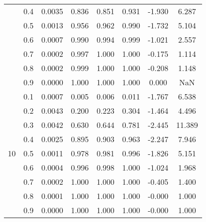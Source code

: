 \documentclass[11pt,a4paper]{report}
\begin{document}
\begin{longtable}{ | c | c || c | c | c | c | c | c | }
 & 0.4 & 0.0035 & 0.836 & 0.851 & 0.931 & -1.930 & 6.287 \\
 & 0.5 & 0.0013 & 0.956 & 0.962 & 0.990 & -1.732 & 5.104 \\
 & 0.6 & 0.0007 & 0.990 & 0.994 & 0.999 & -1.021 & 2.557 \\
 & 0.7 & 0.0002 & 0.997 & 1.000 & 1.000 & -0.175 & 1.114 \\
 & 0.8 & 0.0002 & 0.999 & 1.000 & 1.000 & -0.208 & 1.148 \\
 & 0.9 & 0.0000 & 1.000 & 1.000 & 1.000 & 0.000 & NaN \\
 \hline
\multirow{9}{*}{10} & 0.1 & 0.0007 & 0.005 & 0.006 & 0.011 & -1.767 & 6.538 \\
 & 0.2 & 0.0043 & 0.200 & 0.223 & 0.304 & -1.464 & 4.496 \\
 & 0.3 & 0.0042 & 0.630 & 0.644 & 0.781 & -2.445 & 11.389 \\
 & 0.4 & 0.0025 & 0.895 & 0.903 & 0.963 & -2.247 & 7.946 \\
 & 0.5 & 0.0011 & 0.978 & 0.981 & 0.996 & -1.826 & 5.151 \\
 & 0.6 & 0.0004 & 0.996 & 0.998 & 1.000 & -1.024 & 1.968 \\
 & 0.7 & 0.0002 & 1.000 & 1.000 & 1.000 & -0.405 & 1.400 \\
 & 0.8 & 0.0001 & 1.000 & 1.000 & 1.000 & -0.000 & 1.000 \\
 & 0.9 & 0.0000 & 1.000 & 1.000 & 1.000 & -0.000 & 1.000 \\
 \hline
\hline
\end{longtable}
\end{document}
